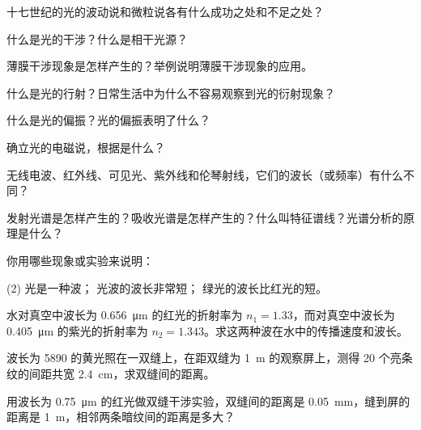 \begin{Review}
\begin{question}
  \item 十七世纪的光的波动说和微粒说各有什么成功之处和不足之处？
  \item 什么是光的干涉？什么是相干光源？
  \item 薄膜干涉现象是怎样产生的？举例说明薄膜干涉现象的应用。
  \item 什么是光的行射？日常生活中为什么不容易观察到光的衍射现象？
  \item 什么是光的偏振？光的偏振表明了什么？
  \item 确立光的电磁说，根据是什么？
  \item 无线电波、红外线、可见光、紫外线和伦琴射线，它们的波长（或频率）有什么不同？
  \item 发射光谱是怎样产生的？吸收光谱是怎样产生的？什么叫特征谱线？光谱分析的原理是什么？
\end{question}
\end{Review}

\begin{Exercise}
\begin{question}
  \item 你用哪些现象或实验来说明：
  \begin{tasks}(2)
    \task 光是一种波；
    \task 光波的波长非常短；
    \task 绿光的波长比红光的短。
  \end{tasks}
  \item 水对真空中波长为 \qty{0.656}{\micro m} 的红光的折射率为 $n_1=1.33$，而对真空中波长为 \qty{0.405}{\micro m} 的紫光的折射率为 $n_2=1.343$。求这两种波在水中的传播速度和波长。
  \item 波长为 \qty{5890}{\text{\AA}} 的黄光照在一双缝上，在距双缝为 \qty{1}{m} 的观察屏上，测得 20 个亮条纹的间距共宽 \qty{2.4}{cm}，求双缝间的距离。
  \item 用波长为 \qty{0.75}{\micro m} 的红光做双缝干涉实验，双缝间的距离是 \qty{0.05}{mm}，缝到屏的距离是 \qty{1}{m}，相邻两条暗纹间的距离是多大？
\end{question}
\end{Exercise}